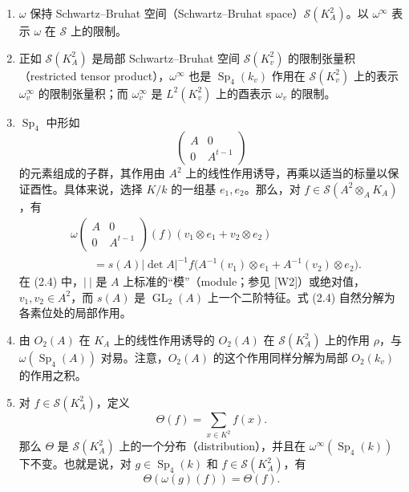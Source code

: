 \begin{enumerate}
\item[(i)] $\omega$ 保持 Schwartz--Bruhat 空间（Schwartz--Bruhat space）$\mathcal S(K_A^2)$。以 $\omega^\infty$ 表示 $\omega$ 在 $\mathcal S$ 上的限制。
\item[(ii)] 正如 $\mathcal S(K_A^2)$ 是局部 Schwartz--Bruhat 空间 $\mathcal S(K_v^2)$ 的限制张量积（restricted tensor product），$\omega^\infty$ 也是 $\operatorname{Sp}_4(k_v)$ 作用在 $\mathcal S(K_v^2)$ 上的表示 $\omega_v^\infty$ 的限制张量积；而 $\omega_v^\infty$ 是 $L^2(K_v^2)$ 上的酉表示 $\omega_v$ 的限制。
\item[(iii)] $\operatorname{Sp}_4$ 中形如
\[
 \begin{pmatrix}A&0\\0&A^{t-1}\end{pmatrix}
\]
的元素组成的子群，其作用由 $A^2$ 上的线性作用诱导，再乘以适当的标量以保证酉性。具体来说，选择 $K/k$ 的一组基 $e_1,e_2$。那么，对 $f\in\mathcal S(A^2\otimes_A K_A)$，有
\begin{equation}
\begin{split}
 &\omega\!\begin{pmatrix}A&0\\0&A^{t-1}\end{pmatrix}(f)
       (v_1\otimes e_1+v_2\otimes e_2)\\
 &\qquad=s(A)|\det A|^{-1}
 f\bigl(A^{-1}(v_1)\otimes e_1+A^{-1}(v_2)\otimes e_2\bigr).
\end{split}\tag{2.4}
\end{equation}
在 (2.4) 中，$|\ |$ 是 $A$ 上标准的“模”（module；参见 [W2]）或绝对值，$v_1,v_2\in A^2$，而 $s(A)$ 是 $\operatorname{GL}_2(A)$ 上一个二阶特征。式 (2.4) 自然分解为各素位处的局部作用。
\item[(iv)] 由 $O_2(A)$ 在 $K_A$ 上的线性作用诱导的 $O_2(A)$ 在 $\mathcal S(K_A^2)$ 上的作用 $\rho$，与 $\omega(\operatorname{Sp}_4(A))$ 对易。注意，$O_2(A)$ 的这个作用同样分解为局部 $O_2(k_v)$ 的作用之积。
\item[(v)] 对 $f\in\mathcal S(K_A^2)$，定义
\begin{equation}
 \Theta(f)=\sum_{x\in K^2}f(x).\tag{2.5}
\end{equation}
那么 $\Theta$ 是 $\mathcal S(K_A^2)$ 上的一个分布（distribution），并且在 $\omega^\infty(\operatorname{Sp}_4(k))$ 下不变。也就是说，对 $g\in\operatorname{Sp}_4(k)$ 和 $f\in\mathcal S(K_A^2)$，有
\begin{equation}
 \Theta(\omega(g)(f))=\Theta(f).\tag{2.6}
\end{equation}
\end{enumerate}

